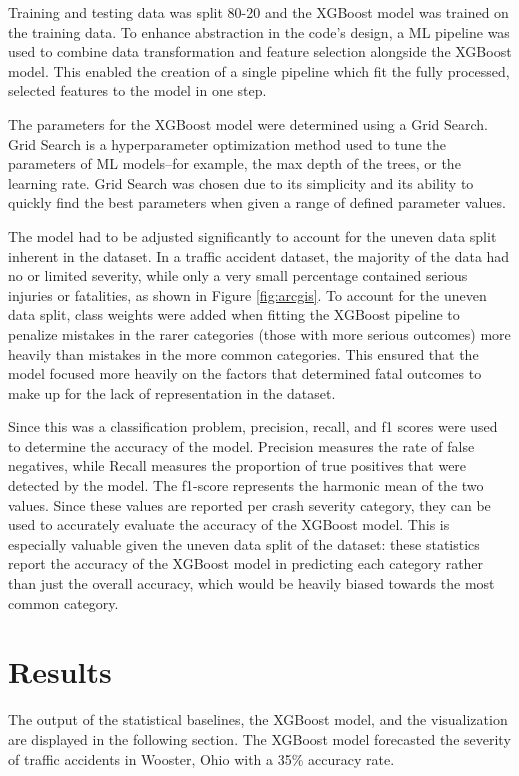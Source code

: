 \documentclass[12pt]{article}
\begin{document}
Training and testing data was split 80-20 and the XGBoost model was trained on the training data. To enhance abstraction in the code's design, a ML pipeline was used to combine data transformation and feature selection alongside
the XGBoost model. This enabled the creation of a single pipeline which fit the fully processed, selected features to the model
in one step.

The parameters for the XGBoost model were determined using a Grid Search. Grid Search is a hyperparameter optimization method
used to tune the parameters of ML models--for example, the max depth of the trees, or the learning rate. Grid Search
was chosen due to its simplicity and its ability to quickly find the best parameters when given a range of defined parameter values.

The model had to be adjusted significantly to account for the uneven data split inherent in the dataset. In a traffic accident
dataset, the majority of the data had no or limited severity, while only a very small percentage contained serious injuries or fatalities, 
as shown in Figure \ref{fig:arcgis}. To account for the uneven data split, class weights were added when fitting the XGBoost pipeline
to penalize mistakes in the rarer categories (those with more serious outcomes) more heavily than mistakes in the more common categories.
This ensured that the model focused more heavily on the factors that determined fatal outcomes to make up for the lack of representation
in the dataset. 

Since this was a classification problem, precision, recall, and f1 scores were used to determine the accuracy of the model. 
Precision measures the rate of false negatives, while Recall measures the proportion of true positives that were detected by the model. 
The f1-score represents the harmonic mean of the two values. Since these values are reported per crash severity category, they can be used
to accurately evaluate the accuracy of the XGBoost model. This is especially valuable given the uneven data split of the dataset: 
these statistics report the accuracy of the XGBoost model in predicting each category rather than just the overall accuracy, which would
be heavily biased towards the most common category.

\section{Results}
The output of the statistical baselines, the XGBoost model, and the visualization are displayed in the following section.  
The XGBoost model forecasted the severity of traffic accidents in Wooster, Ohio with a 35\% accuracy rate. 
\end{document}
